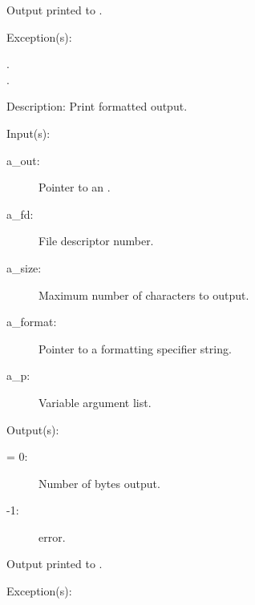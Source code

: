 \begin{capi}
\begin{capilist}
\begin{description}
\begin{description}
			\end{description}
		\item{Output printed to .}
		\end{description}
	\item[Exception(s): ]
		\begin{description}\item[]
		\item[.]
		\item[.]
		\end{description}
	\item[Description: ]
		Print formatted output.
	\end{capilist}
\label{out_put_fvn}
	\begin{capilist}
	\item[Input(s): ]
		\begin{description}\item[]
		\item[a\_out: ]
			Pointer to an .
		\item[a\_fd: ]
			File descriptor number.
		\item[a\_size: ]
			Maximum number of characters to output.
		\item[a\_format: ]
			Pointer to a formatting specifier string.
		\item[a\_p: ]
			Variable argument list.
		\end{description}
	\item[Output(s): ]
		\begin{description}\item[]
		\item[retval: ]
			\begin{description}\item[]
			\item[{\gt}= 0: ]
				Number of bytes output.
			\item[-1: ]
				 error.
			\end{description}
		\item{Output printed to .}
		\end{description}
	\item[Exception(s): ]
		\begin{description}\item[]

\end{description}
\end{capilist}
\end{capi}
